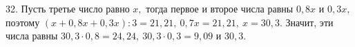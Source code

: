 32. Пусть третье число равно $x,$ тогда первое и второе числа равны $0,8x$ и $0,3x,$ поэтому $(x+0,8x+0,3x):3=21,21,\ 0,7x=21,21,\ x=30,3.$ Значит, эти числа равны $30,3\cdot0,8=24,24,\ 30,3\cdot0,3=9,09$ и $30,3.$\\
